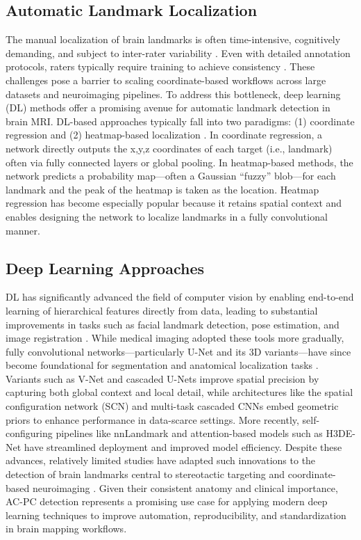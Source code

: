 \subsection{Automatic Landmark Localization}
The manual localization of brain landmarks is often time-intensive, cognitively demanding, and subject to inter-rater variability \cite{Abbass2022-lf, Lau2019-eh,Pallavaram2008-zr}. Even with detailed annotation protocols, raters typically require training to achieve consistency \cite{Lau2019-eh}. These challenges pose a barrier to scaling coordinate-based workflows across large datasets and neuroimaging pipelines. To address this bottleneck, deep learning (DL) methods offer a promising avenue for automatic landmark detection in brain MRI. DL-based approaches typically fall into two paradigms: (1) coordinate regression \cite{Neupane2024-vt} and (2) heatmap-based localization \cite{Payer2016-ik}. In coordinate regression, a network directly outputs the x,y,z coordinates of each target (i.e., landmark) often via fully connected layers or global pooling. In heatmap-based methods, the network predicts a probability map---often a Gaussian “fuzzy” blob---for each landmark and the peak of the heatmap is taken as the location. Heatmap regression has become especially popular because it retains spatial context and enables designing the network to localize landmarks in a fully convolutional manner.

\subsection{Deep Learning Approaches}
DL has significantly advanced the field of computer vision by enabling end-to-end learning of hierarchical features directly from data, leading to substantial improvements in tasks such as facial landmark detection, pose estimation, and image registration \cite{Lathuiliere2018-oy}. While medical imaging adopted these tools more gradually, fully convolutional networks—particularly U-Net and its 3D variants—have since become foundational for segmentation and anatomical localization tasks \cite{Akkus2017-eh, Falk2019-us}. Variants such as V-Net and cascaded U-Nets improve spatial precision by capturing both global context and local detail, while architectures like the spatial configuration network (SCN) \cite{Payer2016-ik, Payer2019-sn} and multi-task cascaded CNNs \cite{Zhang2017-dc} embed geometric priors to enhance performance in data-scarce settings. More recently, self-configuring pipelines like nnLandmark \cite{Ertl2025-wu} and attention-based models such as H3DE-Net \cite{Huang2025-vt} have streamlined deployment and improved model efficiency. Despite these advances, relatively limited studies have adapted such innovations to the detection of brain landmarks central to stereotactic targeting and coordinate-based neuroimaging \cite{Edwards2021-su}. Given their consistent anatomy and clinical importance, AC-PC detection represents a promising use case for applying modern deep learning techniques to improve automation, reproducibility, and standardization in brain mapping workflows.

